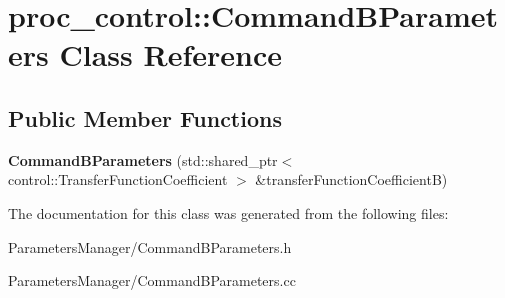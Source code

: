 \hypertarget{classproc__control_1_1_command_b_parameters}{}\section{proc\+\_\+control\+:\+:Command\+B\+Parameters Class Reference}
\label{classproc__control_1_1_command_b_parameters}
\subsection*{Public Member Functions}
\begin{DoxyCompactItemize}
\item 
\mbox{\label{classproc__control_1_1_command_b_parameters_a584df157697192334ec328df86440b88}} 
{\bfseries Command\+B\+Parameters} (std\+::shared\+\_\+ptr$<$ control\+::\+Transfer\+Function\+Coefficient $>$ \&transfer\+Function\+CoefficientB)
\end{DoxyCompactItemize}


The documentation for this class was generated from the following files\+:\begin{DoxyCompactItemize}
\item 
Parameters\+Manager/Command\+B\+Parameters.\+h\item 
Parameters\+Manager/Command\+B\+Parameters.\+cc\end{DoxyCompactItemize}
